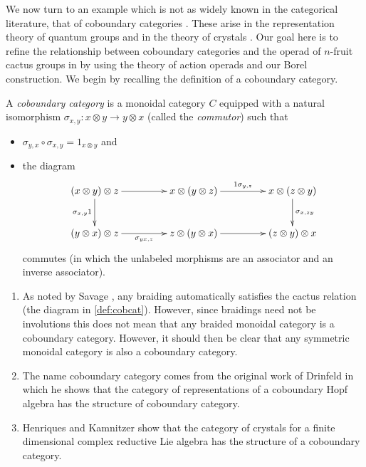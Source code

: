 We now turn to an example which is not as widely known in the categorical literature, that of coboundary categories \cite{drin-quasihopf}. These arise in the representation theory of quantum groups and in the theory of crystals \cite{hk-cobound, hk-quantum}. Our goal here is to refine the relationship between coboundary categories and the operad of $n$-fruit cactus groups in \cite{hk-cobound} by using the theory of action operads and our Borel construction. We begin by recalling the definition of a coboundary category.


\begin{Defi}\label{def:cobcat}
A \textit{coboundary category} is a monoidal category $C$ equipped with a natural isomorphism $\sigma_{x,y} \colon x \otimes y \rightarrow y \otimes x$ (called the \textit{commutor}) such that
\begin{itemize}
\item $\sigma_{y,x} \circ \sigma_{x,y} = 1_{x \otimes y}$ and
\item the diagram
  \[
    \xy
      (0,0)*+{(x \otimes y) \otimes z} ="00";
      (35,0)*+{x \otimes (y \otimes z)} ="10";
      (70,0)*+{x \otimes (z \otimes y)} ="20";
      (0,-15)*+{(y \otimes x) \otimes z} ="01";
      (35,-15)*+{z \otimes (y \otimes x)} ="11";
      (70,-15)*+{(z \otimes y )\otimes x} ="21";
      {\ar "00"; "10" };
      {\ar^{1 \sigma_{y,z}} "10"; "20" };
      {\ar^{\sigma_{x,zy}} "20"; "21" };
      {\ar_{\sigma_{x,y}1} "00"; "01" };
      {\ar_{\sigma_{yx,z}} "01"; "11" };
      {\ar "11"; "21" };
    \endxy
  \]
commutes (in which the unlabeled morphisms are an associator and an inverse associator).
\end{itemize}
\end{Defi}

\begin{example}\label{ex:cobcats}
\begin{enumerate}
\item As noted by Savage \cite{savage-braidcob}, any braiding automatically satisfies the cactus relation (the diagram in \cref{def:cobcat}). However, since braidings need not be involutions this does not mean that any braided monoidal category is a coboundary category. However, it should then be clear that any symmetric monoidal category is also a coboundary category.
\item The name coboundary category comes from the original work of Drinfeld \cite{drin-quasihopf} in which he shows that the category of representations of a coboundary Hopf algebra has the structure of coboundary category.
\item Henriques and Kamnitzer \cite{hk-cobound} show that the category of crystals for a finite dimensional complex reductive Lie algebra has the structure of a coboundary category. 
\end{enumerate}
\end{example}

